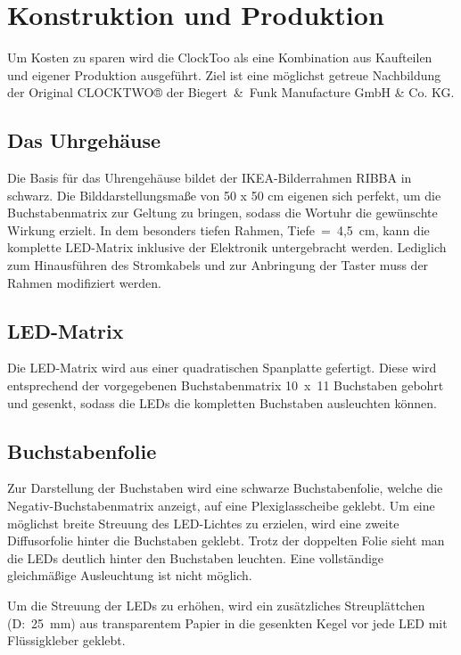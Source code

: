 
\section{Konstruktion und Produktion}
\label{sec:KonstruktionFertigung}

\begin{multicols}{2}
Um Kosten zu sparen wird die ClockToo als eine Kombination aus Kaufteilen und eigener Produktion ausgeführt. Ziel ist eine möglichst getreue Nachbildung der Original CLOCKTWO® der Biegert~\&~Funk Manufacture GmbH \& Co. KG. 

\subsection{Das Uhrgehäuse}

Die Basis für das Uhrengehäuse bildet der IKEA-Bilderrahmen RIBBA in schwarz. Die Bilddarstellungsmaße von 50 x 50 cm eigenen sich perfekt, um die Buchstabenmatrix zur Geltung zu bringen, sodass die Wortuhr die gewünschte Wirkung erzielt. In dem besonders tiefen Rahmen,  Tiefe~=~4,5~cm, kann die komplette LED-Matrix inklusive der Elektronik untergebracht werden. Lediglich zum Hinausführen des Stromkabels und zur Anbringung der Taster muss der Rahmen modifiziert werden. 

\subsection{LED-Matrix}

Die LED-Matrix wird aus einer quadratischen Spanplatte gefertigt. Diese wird entsprechend der vorgegebenen Buchstabenmatrix 10~x~11 Buchstaben gebohrt und gesenkt, sodass die LEDs die kompletten Buchstaben ausleuchten können. 

\subsection{Buchstabenfolie}

Zur Darstellung der Buchstaben wird eine schwarze Buchstabenfolie, welche die Negativ-Buchstabenmatrix anzeigt, auf eine Plexiglasscheibe geklebt. Um eine möglichst breite Streuung des LED-Lichtes zu erzielen, wird eine zweite Diffusorfolie hinter die Buchstaben geklebt. Trotz der doppelten Folie sieht man die LEDs deutlich hinter den Buchstaben leuchten. Eine vollständige gleichmäßige Ausleuchtung ist nicht möglich. 

Um die Streuung der LEDs zu erhöhen, wird ein zusätzliches Streuplättchen (D:~25~mm) aus transparentem Papier in die gesenkten Kegel vor jede LED mit Flüssigkleber geklebt. 



\end{multicols}

